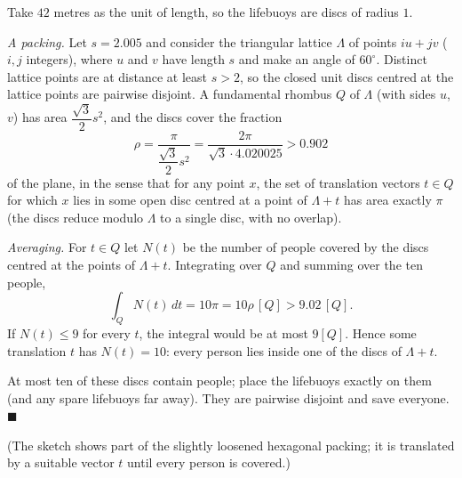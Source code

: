 Take $42$ metres as the unit of length, so the lifebuoys are discs of radius $1$.

\emph{A packing.} Let $s=2.005$ and consider the triangular lattice $\Lambda$ of points $iu+jv$ ($i,j$ integers), where $u$ and $v$ have length $s$ and make an angle of $60^\circ$. Distinct lattice points are at distance at least $s>2$, so the closed unit discs centred at the lattice points are pairwise disjoint. A fundamental rhombus $Q$ of $\Lambda$ (with sides $u$, $v$) has area $\dfrac{\sqrt3}{2}s^2$, and the discs cover the fraction
\[\rho=\dfrac{\pi}{\dfrac{\sqrt3}{2}s^2}=\dfrac{2\pi}{\sqrt3\cdot4.020025}>0.902\]
of the plane, in the sense that for any point $x$, the set of translation vectors $t\in Q$ for which $x$ lies in some open disc centred at a point of $\Lambda+t$ has area exactly $\pi$ (the discs reduce modulo $\Lambda$ to a single disc, with no overlap).

\emph{Averaging.} For $t\in Q$ let $N(t)$ be the number of people covered by the discs centred at the points of $\Lambda+t$. Integrating over $Q$ and summing over the ten people,
\[\int_QN(t)\,dt=10\pi=10\rho\,[Q]>9.02\,[Q].\]
If $N(t)\le9$ for every $t$, the integral would be at most $9[Q]$. Hence some translation $t$ has $N(t)=10$: every person lies inside one of the discs of $\Lambda+t$.

At most ten of these discs contain people; place the lifebuoys exactly on them (and any spare lifebuoys far away). They are pairwise disjoint and save everyone. $\blacksquare$


(The sketch shows part of the slightly loosened hexagonal packing; it is translated by a suitable vector $t$ until every person is covered.)
